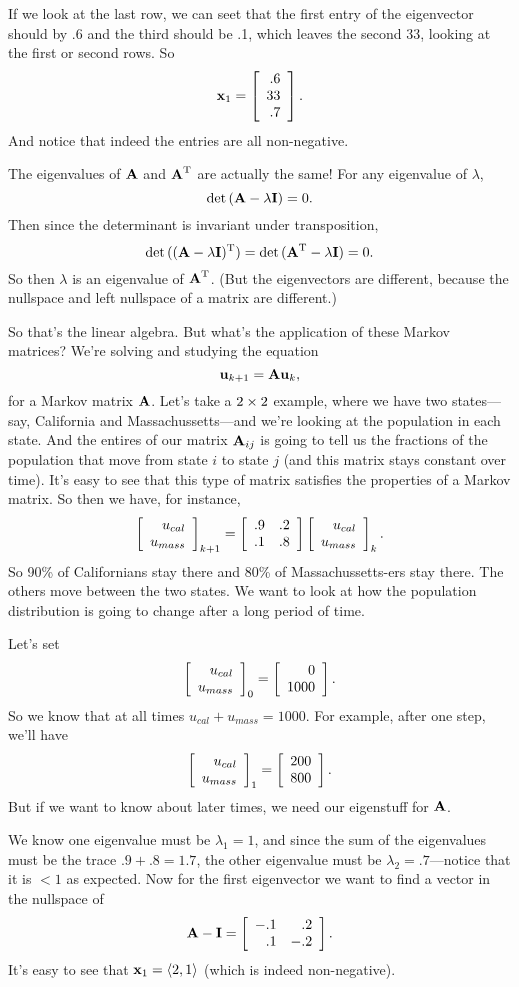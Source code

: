 If we look at the last row, we can seet that the first entry of the eigenvector should by .6 and the third should be .1, which leaves the second 33, looking at the first or second rows. So 
\[ \boldsymbol{\mathbf{x}}_1 = \left[ \begin{array}{rrrrrrrrrrrrrrrrrrrrrrrrr} .6\\33\\.7\\ \end{array} \right]. \]
And notice that indeed the entries are all non-negative. 

\brm
The eigenvalues of $\boldsymbol{\mathbf{A}}$ and $\boldsymbol{\mathbf{A}}^\mathrm{T}$ are actually the same! For any eigenvalue of $\lambda$,
\[ \mathrm{det}\, (\boldsymbol{\mathbf{A}} - \lambda \boldsymbol{\mathbf{I}}) = 0. \]
Then since the determinant is invariant under transposition, 
\[ \mathrm{det}\, ((\boldsymbol{\mathbf{A}} - \lambda \boldsymbol{\mathbf{I}})^\mathrm{T}) = \mathrm{det}\, (\boldsymbol{\mathbf{A}}^\mathrm{T} - \lambda \boldsymbol{\mathbf{I}}) = 0. \]
So then $\lambda$ is an eigenvalue of $\boldsymbol{\mathbf{A}}^\mathrm{T}$. (But the eigenvectors are different, because the nullspace and left nullspace of a matrix are different.)
\erm

So that's the linear algebra. But what's the application of these Markov matrices? We're solving and studying the equation
\[ \boldsymbol{\mathbf{u}}_{k+1} = \boldsymbol{\mathbf{A}} \boldsymbol{\mathbf{u}}_k, \]
for a Markov matrix $\boldsymbol{\mathbf{A}}$. Let's take a $2 \times 2$ example, where we have two states---say, California and Massachussetts---and we're looking at the population in each state. And the entires of our matrix $\boldsymbol{\mathbf{A}}_{ij}$ is going to tell us the fractions of the population that move from state $i$ to state $j$ (and this matrix stays constant over time). It's easy to see that this type of matrix satisfies the properties of a Markov matrix. So then we have, for instance,
\[ \left[ \begin{array}{rrrrrrrrrrrrrrrrrrrrrrrrr} u_{cal}\\u_{mass}\\ \end{array} \right]_{k+1} = \left[ \begin{array}{rrrrrrrrrrrrrrrrrrrrrrrrr} .9&.2\\.1&.8\\ \end{array} \right]\left[ \begin{array}{rrrrrrrrrrrrrrrrrrrrrrrrr} u_{cal}\\u_{mass}\\ \end{array} \right]_{k}. \]
So 90\% of Californians stay there and 80\% of Massachussetts-ers stay there. The others move between the two states. We want to look at how the population distribution is going to change after a long period of time. 

Let's set 
\[ \left[ \begin{array}{rrrrrrrrrrrrrrrrrrrrrrrrr} u_{cal}\\u_{mass}\\ \end{array} \right]_0 = \left[ \begin{array}{rrrrrrrrrrrrrrrrrrrrrrrrr} 0\\1000\\ \end{array} \right]. \]
So we know that at all times $u_{cal} + u_{mass} = 1000$. For example, after one step, we'll have 
\[ \left[ \begin{array}{rrrrrrrrrrrrrrrrrrrrrrrrr} u_{cal}\\u_{mass}\\ \end{array} \right]_1 = \left[ \begin{array}{rrrrrrrrrrrrrrrrrrrrrrrrr} 200\\800\\ \end{array} \right]. \]
But if we want to know about later times, we need our eigenstuff for $\boldsymbol{\mathbf{A}}$.

We know one eigenvalue must be $\lambda_1 = 1$, and since the sum of the eigenvalues must be the trace $.9 + .8 = 1.7$, the other eigenvalue must be $\lambda_2 = .7$---notice that it is $<1$ as expected. Now for the first eigenvector we want to find a vector in the nullspace of 
\[ \boldsymbol{\mathbf{A}} - \boldsymbol{\mathbf{I}} = \left[ \begin{array}{rrrrrrrrrrrrrrrrrrrrrrrrr} -.1&.2\\.1&-.2\\ \end{array} \right]. \]
It's easy to see that $\boldsymbol{\mathbf{x}}_1 = \langle 2,1 \rangle$ (which is indeed non-negative).


